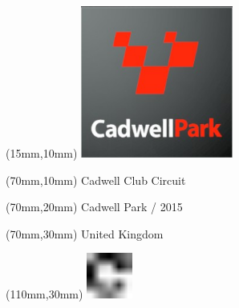 \null\newpage
\begin{textblock*}{50mm}(15mm,10mm)%
\includegraphics[width=50mm]{LG/2015-05-20_00076.png}
\end{textblock*}
\begin{textblock*}{130mm}(70mm,10mm)%
{\fontsize{20}{20}\selectfont Cadwell Club Circuit}\\
\end{textblock*}
\begin{textblock*}{120mm}(70mm,20mm)%
{\fontsize{16}{16}\selectfont Cadwell Park / 2015}\\
\end{textblock*}
\begin{textblock*}{120mm}(70mm,30mm)%
{\fontsize{12}{12}\selectfont United Kingdom}
\end{textblock*}
\begin{textblock*}{30mm}(110mm,30mm)%
\centering
\includegraphics[height=15mm]{icons/fa-rotate-right.pdf}
\end{textblock*}
